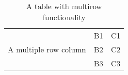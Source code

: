 \begin{table}[h]
\caption{A table with multirow functionality}
\begin{center} \small
\begin{tabular}{ccc}
\hline 

\multirow{3}{*}{A multiple row column} & B1 & C1 \\

 & B2 & C2 \\

 & B3 & C3 \\

\hline 
\end{tabular}
\end{center}
\end{table}